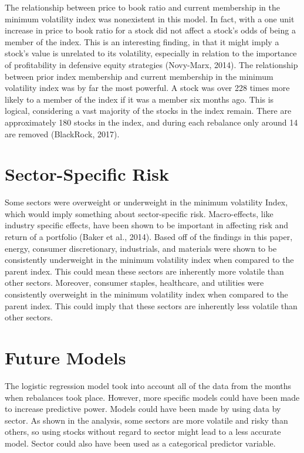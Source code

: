 \documentclass[12pt,twoside]{reedthesis}
\theoremstyle{definition}
\theoremstyle{definition}
\theoremstyle{definition}
\theoremstyle{remark}
\begin{document}
The relationship between price to book ratio and current membership in
the minimum volatility index was nonexistent in this model. In fact,
with a one unit increase in price to book ratio for a stock did not
affect a stock's odds of being a member of the index. This is an
interesting finding, in that it might imply a stock's value is unrelated
to its volatility, especially in relation to the importance of
profitability in defensive equity strategies (Novy-Marx, 2014). The
relationship between prior index membership and current membership in
the minimum volatility index was by far the most powerful. A stock was
over 228 times more likely to a member of the index if it was a member
six months ago. This is logical, considering a vast majority of the
stocks in the index remain. There are approximately 180 stocks in the
index, and during each rebalance only around 14 are removed (BlackRock,
2017).

\section{Sector-Specific Risk}\label{sector-specific-risk}

Some sectors were overweight or underweight in the minimum volatility
Index, which would imply something about sector-specific risk.
Macro-effects, like industry specific effects, have been shown to be
important in affecting risk and return of a portfolio (Baker et al.,
2014). Based off of the findings in this paper, energy, consumer
discretionary, industrials, and materials were shown to be consistently
underweight in the minimum volatility index when compared to the parent
index. This could mean these sectors are inherently more volatile than
other sectors. Moreover, consumer staples, healthcare, and utilities
were consistently overweight in the minimum volatility index when
compared to the parent index. This could imply that these sectors are
inherently less volatile than other sectors.

\section{Future Models}\label{future-models}

The logistic regression model took into account all of the data from the
months when rebalances took place. However, more specific models could
have been made to increase predictive power. Models could have been made
by using data by sector. As shown in the analysis, some sectors are more
volatile and risky than others, so using stocks without regard to sector
might lead to a less accurate model. Sector could also have been used as
a categorical predictor variable.
\end{document}
